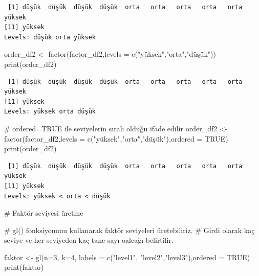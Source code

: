 \documentclass[
  letterpaper,
  DIV=11,
  numbers=noendperiod]{scrreprt}
\newenvironment{Shaded}{\begin{snugshade}}{\end{snugshade}}
\newcommand{\AttributeTok}[1]{\textcolor[rgb]{0.40,0.45,0.13}{#1}}
\newcommand{\CommentTok}[1]{\textcolor[rgb]{0.37,0.37,0.37}{#1}}
\newcommand{\ConstantTok}[1]{\textcolor[rgb]{0.56,0.35,0.01}{#1}}
\newcommand{\DecValTok}[1]{\textcolor[rgb]{0.68,0.00,0.00}{#1}}
\newcommand{\FunctionTok}[1]{\textcolor[rgb]{0.28,0.35,0.67}{#1}}
\newcommand{\NormalTok}[1]{\textcolor[rgb]{0.00,0.23,0.31}{#1}}
\newcommand{\OtherTok}[1]{\textcolor[rgb]{0.00,0.23,0.31}{#1}}
\newcommand{\StringTok}[1]{\textcolor[rgb]{0.13,0.47,0.30}{#1}}
\begin{document}
\begin{verbatim}
 [1] düşük  düşük  düşük  düşük  orta   orta   orta   orta   orta   yüksek
[11] yüksek
Levels: düşük orta yüksek
\end{verbatim}

\begin{Shaded}
\begin{Highlighting}[]
\NormalTok{order\_df2 }\OtherTok{\textless{}{-}} \FunctionTok{factor}\NormalTok{(factor\_df2,}\AttributeTok{levels =} \FunctionTok{c}\NormalTok{(}\StringTok{"yüksek"}\NormalTok{,}\StringTok{"orta"}\NormalTok{,}\StringTok{"düşük"}\NormalTok{))}
\FunctionTok{print}\NormalTok{(order\_df2)}
\end{Highlighting}
\end{Shaded}

\begin{verbatim}
 [1] düşük  düşük  düşük  düşük  orta   orta   orta   orta   orta   yüksek
[11] yüksek
Levels: yüksek orta düşük
\end{verbatim}

\begin{Shaded}
\begin{Highlighting}[]
\CommentTok{\# ordered=TRUE ile seviyelerin sıralı olduğu ifade edilir}
\NormalTok{order\_df2 }\OtherTok{\textless{}{-}} \FunctionTok{factor}\NormalTok{(factor\_df2,}\AttributeTok{levels =} \FunctionTok{c}\NormalTok{(}\StringTok{"yüksek"}\NormalTok{,}\StringTok{"orta"}\NormalTok{,}\StringTok{"düşük"}\NormalTok{),}\AttributeTok{ordered =} \ConstantTok{TRUE}\NormalTok{)}
\FunctionTok{print}\NormalTok{(order\_df2)}
\end{Highlighting}
\end{Shaded}

\begin{verbatim}
 [1] düşük  düşük  düşük  düşük  orta   orta   orta   orta   orta   yüksek
[11] yüksek
Levels: yüksek < orta < düşük
\end{verbatim}

\begin{Shaded}
\begin{Highlighting}[]
\CommentTok{\# Faktör seviyesi üretme}

\CommentTok{\# gl() fonksiyonunu kullanarak faktör seviyeleri üretebiliriz. }
\CommentTok{\# Girdi olarak kaç seviye ve her seviyeden kaç tane sayı oalcağı belirtilir.}

\NormalTok{faktor }\OtherTok{\textless{}{-}} \FunctionTok{gl}\NormalTok{(}\AttributeTok{n=}\DecValTok{3}\NormalTok{, }\AttributeTok{k=}\DecValTok{4}\NormalTok{, }\AttributeTok{labels =} \FunctionTok{c}\NormalTok{(}\StringTok{"level1"}\NormalTok{, }\StringTok{"level2"}\NormalTok{,}\StringTok{"level3"}\NormalTok{),}\AttributeTok{ordered =} \ConstantTok{TRUE}\NormalTok{)}
\FunctionTok{print}\NormalTok{(faktor)}
\end{Highlighting}
\end{Shaded}
\end{document}
